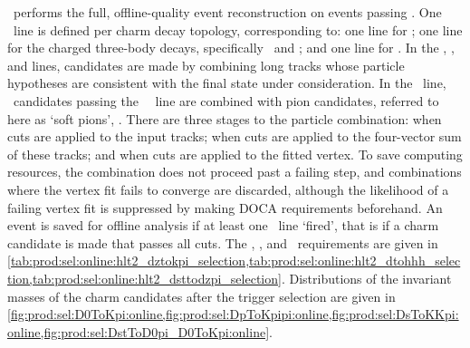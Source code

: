 \hlttwo\ performs the full, offline-quality event reconstruction on events 
passing \hltone.
One \hlttwo\ line is defined per charm decay topology, corresponding to: one 
line for \DzToKpi; one line for the charged three-body decays, specifically 
\DpToKpipi\ and \DspToKKpi; and one line for \DstToDzpi.
In the \PDzero, \PDplus, and \PDsplus lines, candidates are made by combining 
long tracks whose particle hypotheses are consistent with the final state under 
consideration.
In the \PDstarp\ line, \PDzero\ candidates passing the \PDzero\ \hlttwo\ line 
are combined with pion candidates, referred to here as `soft pions', 
\Ppiplussoft.
There are three stages to the particle combination: when cuts are applied to 
the input tracks; when cuts are applied to the four-vector sum of these tracks; 
and when cuts are applied to the fitted vertex.
To save computing resources, the combination does not proceed past a failing 
step, and combinations where the vertex fit fails to converge are discarded, 
although the likelihood of a failing vertex fit is suppressed by making 
\ac{DOCA} requirements beforehand.
An event is saved for offline analysis if at least one \hlttwo\ line `fired', 
that is if a charm candidate is made that passes all cuts.
The \DzToKpi, \DTohhh, and \DstToDzpi\ requirements are given in 
\cref{tab:prod:sel:online:hlt2_dztokpi_selection,tab:prod:sel:online:hlt2_dtohhh_selection,tab:prod:sel:online:hlt2_dsttodzpi_selection}.
Distributions of the invariant masses of the charm candidates after the trigger 
selection are given in 
\cref{fig:prod:sel:D0ToKpi:online,fig:prod:sel:DpToKpipi:online,fig:prod:sel:DsToKKpi:online,fig:prod:sel:DstToD0pi_D0ToKpi:online}.

\begin{table}
  \caption{%
    List of fills used in analysis, along with the integrated luminosity 
    \intlumi, the \lzero\ \nobias\ rate, and the corresponding effective 
    \lzero\ efficiency (``eff.'') for each fill.
  }
  \label{tab:prod:sel:online:l0_nobias_rateeff}
  \centering
  
\end{table}

\begin{table}
  \caption{%
    Requirements made on the track that fires the \hltone\ trigger line.
  }
  \label{tab:prod:sel:online:hlt1_selection}
  \centering
  
\end{table}

\begin{table}
  \caption{%
    Requirements made in the \hlttwo\ \DzToKpi\ selection.
    The track \chisq\ criterion is applied in the reconstruction and listed 
    here for completeness.
  }
  \label{tab:prod:sel:online:hlt2_dztokpi_selection}
  \centering
  
\end{table}

